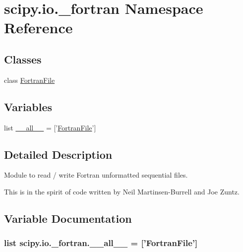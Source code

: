 \hypertarget{namespacescipy_1_1io_1_1__fortran}{}\section{scipy.\+io.\+\_\+fortran Namespace Reference}
\label{namespacescipy_1_1io_1_1__fortran}
\subsection*{Classes}
\begin{DoxyCompactItemize}
\item 
class \hyperlink{classscipy_1_1io_1_1__fortran_1_1FortranFile}{Fortran\+File}
\end{DoxyCompactItemize}
\subsection*{Variables}
\begin{DoxyCompactItemize}
\item 
list \hyperlink{namespacescipy_1_1io_1_1__fortran_a3ecd95d1b0bc8ee8f517654ce1a6a0a0}{\+\_\+\+\_\+all\+\_\+\+\_\+} = \mbox{[}'\hyperlink{classscipy_1_1io_1_1__fortran_1_1FortranFile}{Fortran\+File}'\mbox{]}
\end{DoxyCompactItemize}


\subsection{Detailed Description}
\begin{DoxyVerb}Module to read / write Fortran unformatted sequential files.

This is in the spirit of code written by Neil Martinsen-Burrell and Joe Zuntz.\end{DoxyVerb}
 

\subsection{Variable Documentation}
\hypertarget{namespacescipy_1_1io_1_1__fortran_a3ecd95d1b0bc8ee8f517654ce1a6a0a0}{}
\subsubsection[{\+\_\+\+\_\+all\+\_\+\+\_\+}]{\setlength{\rightskip}{0pt plus 5cm}list scipy.\+io.\+\_\+fortran.\+\_\+\+\_\+all\+\_\+\+\_\+ = \mbox{[}'{\bf Fortran\+File}'\mbox{]}}\label{namespacescipy_1_1io_1_1__fortran_a3ecd95d1b0bc8ee8f517654ce1a6a0a0}
